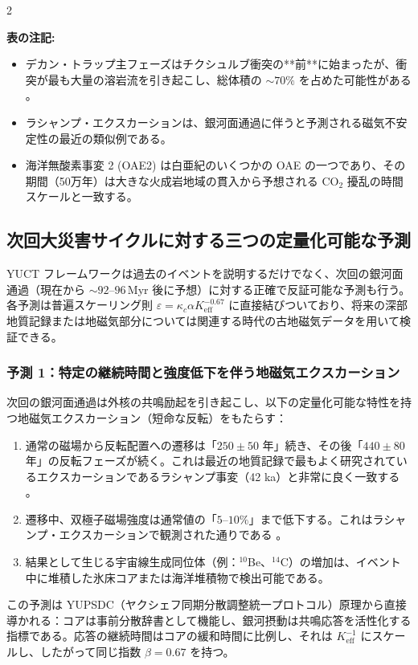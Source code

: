 \documentclass[12pt,a4paper]{article}
\begin{document}
	\begin{multicols}{2}
		
		\noindent
		\textbf{表の注記:}
		\begin{itemize}
			\item デカン・トラップ主フェーズはチクシュルブ衝突の**前**に始まったが、衝突が最も大量の溶岩流を引き起こし、総体積の \(\sim 70\%\) を占めた可能性がある \cite{DeccanTriggering}。
			\item ラシャンプ・エクスカーションは、銀河面通過に伴うと予測される磁気不安定性の最近の類似例である。
			\item 海洋無酸素事変 2 (OAE2) は白亜紀のいくつかの OAE の一つであり、その期間（50万年）は大きな火成岩地域の貫入から予想される CO\(_2\) 擾乱の時間スケールと一致する。
		\end{itemize}
		
		\subsection{次回大災害サイクルに対する三つの定量化可能な予測}
		YUCT フレームワークは過去のイベントを説明するだけでなく、次回の銀河面通過（現在から \(\sim 92\)–\(96\) Myr 後に予想）に対する正確で反証可能な予測も行う。各予測は普遍スケーリング則 \(\varepsilon = \kappa_c \alpha K_{\mathrm{eff}}^{-0.67}\) に直接結びついており、将来の深部地質記録または地磁気部分については関連する時代の古地磁気データを用いて検証できる。
		
		\subsubsection{予測 1：特定の継続時間と強度低下を伴う地磁気エクスカーション}
		次回の銀河面通過は外核の共鳴励起を引き起こし、以下の定量化可能な特性を持つ地磁気エクスカーション（短命な反転）をもたらす：
		\begin{enumerate}
			\item 通常の磁場から反転配置への遷移は「\(250 \pm 50\) 年」続き、その後「\(440 \pm 80\) 年」の反転フェーズが続く。これは最近の地質記録で最もよく研究されているエクスカーションであるラシャンプ事変（42 ka）と非常に良く一致する \cite{Laschamp}。
			\item 遷移中、双極子磁場強度は通常値の「\(5\)–\(10\%\)」まで低下する。これはラシャンプ・エクスカーションで観測された通りである \cite{Laschamp}。
			\item 結果として生じる宇宙線生成同位体（例：\(^{10}\)Be、\(^{14}\)C）の増加は、イベント中に堆積した氷床コアまたは海洋堆積物で検出可能である。
		\end{enumerate}
		この予測は YUPSDC（ヤクシェフ同期分散調整統一プロトコル）原理から直接導かれる：コアは事前分散辞書として機能し、銀河摂動は共鳴応答を活性化する指標である。応答の継続時間はコアの緩和時間に比例し、それは \(K_{\mathrm{eff}}^{-1}\) にスケールし、したがって同じ指数 \(\beta=0.67\) を持つ。
		

\end{multicols}
\end{document}
